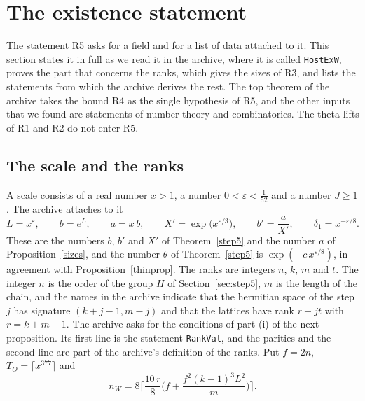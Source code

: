 \documentclass[11pt,letterpaper]{article}
\numberwithin{equation}{section}
\begin{document}
\section{The existence statement}\label{sec:host}

The statement R5 asks for a field and for a list of data attached to it. This section states it in full as we read it in the archive, where it is called \texttt{HostExW}, proves the part that concerns the ranks, which gives the sizes of R3, and lists the statements from which the archive derives the rest. The top theorem of the archive takes the bound R4 as the single hypothesis of R5, and the other inputs that we found are statements of number theory and combinatorics. The theta lifts of R1 and R2 do not enter R5.

\subsection{The scale and the ranks}

A scale consists of a real number $x>1$, a number $0<\varepsilon<\tfrac1{52}$ and a number $J\ge1$. The archive attaches to it
\[
L=x^{\varepsilon},\qquad b=e^{L},\qquad a=x\,b,\qquad X'=\exp\big(x^{\varepsilon/3}\big),\qquad b'=\frac a{X'},\qquad\delta_1=x^{-\varepsilon/8}.
\]
These are the numbers $b$, $b'$ and $X'$ of Theorem~\ref{step5} and the number $a$ of Proposition~\ref{sizes}, and the number $\theta$ of Theorem~\ref{step5} is $\exp(-c\,x^{\varepsilon/8})$, in agreement with Proposition~\ref{thinprop}. The ranks are integers $n$, $k$, $m$ and $t$. The integer $n$ is the order of the group $H$ of Section~\ref{sec:step5}, $m$ is the length of the chain, and the names in the archive indicate that the hermitian space of the step $j$ has signature $(k+j-1,m-j)$ and that the lattices have rank $r+jt$ with $r=k+m-1$. The archive asks for the conditions of part (i) of the next proposition. Its first line is the statement \texttt{RankVal}, and the parities and the second line are part of the archive's definition of the ranks. Put $f=2n$, $T_O=\lceil x^{377}\rceil$ and
\[
n_W=8\Big\lceil\frac{10\,r}8\Big(f+\frac{f^2(k-1)^3L^2}{m}\Big)\Big\rceil .
\]
\end{document}
